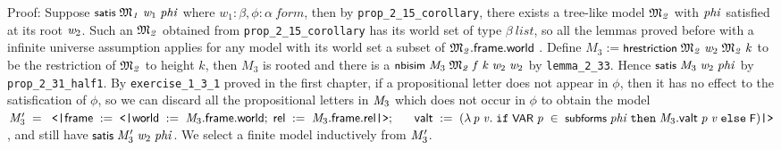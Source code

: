 \documentclass[letterpaper]{article}
\renewcommand{\HOLConst}[1]{{\textsf{\upshape\small #1}}}
\renewcommand{\HOLinline}[1]{\ensuremath{#1}}
\renewcommand{\HOLKeyword}[1]{\texttt{#1}}
\begin{document}
Proof: Suppose \HOLinline{\HOLConst{satis}\;\HOLFreeVar{\ensuremath{\mathfrak{M}\sb{1}}}\;\HOLFreeVar{w\sb{\mathrm{1}}}\;\HOLFreeVar{phi}} where $w_1:\beta,\phi:\alpha\ form$, then by \texttt{prop_2_15_corollary}, there exists a tree-like model \HOLinline{\HOLFreeVar{\ensuremath{\mathfrak{M}\sb{2}}}} with \HOLinline{\HOLFreeVar{phi}} satisfied at its root \HOLinline{\HOLFreeVar{w\sb{\mathrm{2}}}}. Such an \HOLinline{\HOLFreeVar{\ensuremath{\mathfrak{M}\sb{2}}}} obtained from \texttt{prop_2_15_corollary} has its world set of type $\beta\ list$, so all the lemmas proved before with a infinite universe assumption applies for any model with its world set a subset of \HOLinline{\HOLFreeVar{\ensuremath{\mathfrak{M}\sb{2}}}.\HOLFieldName{frame}.\HOLFieldName{world}} . Define $M_3:=$\HOLinline{\HOLConst{hrestriction}\;\HOLFreeVar{\ensuremath{\mathfrak{M}\sb{2}}}\;\HOLFreeVar{w\sb{\mathrm{2}}}\;\HOLFreeVar{\ensuremath{\mathfrak{M}\sb{2}}}\;\HOLFreeVar{k}} to be the restriction of \HOLinline{\HOLFreeVar{\ensuremath{\mathfrak{M}\sb{2}}}} to height $k$, then $M_3$ is rooted and there is a \HOLinline{\HOLConst{nbisim}\;\HOLFreeVar{M\sb{\mathrm{3}}}\;\HOLFreeVar{\ensuremath{\mathfrak{M}\sb{2}}}\;\HOLFreeVar{f}\;\HOLFreeVar{k}\;\HOLFreeVar{w\sb{\mathrm{2}}}\;\HOLFreeVar{w\sb{\mathrm{2}}}} by \texttt{lemma_2_33}. Hence \HOLinline{\HOLConst{satis}\;\HOLFreeVar{M\sb{\mathrm{3}}}\;\HOLFreeVar{w\sb{\mathrm{2}}}\;\HOLFreeVar{phi}} by \texttt{prop_2_31_half1}. By \texttt{exercise_1_3_1} proved in the first chapter, if a propositional letter does not appear in $\phi$, then it has no effect to the satisfication of $\phi$, so we can discard all the propositional letters in \HOLinline{\HOLFreeVar{M\sb{\mathrm{3}}}} which does not occur in $\phi$ to obtain the model \HOLinline{\HOLFreeVar{M\sb{\mathrm{3}}\sp{\prime}}\;\HOLSymConst{=}\\
\;\;\HOLTokenLeftrec{}\HOLFieldName{frame}\;:=\;\HOLTokenLeftrec{}\HOLFieldName{world}\;:=\;\HOLFreeVar{M\sb{\mathrm{3}}}.\HOLFieldName{frame}.\HOLFieldName{world};\;\HOLFieldName{rel}\;:=\;\HOLFreeVar{M\sb{\mathrm{3}}}.\HOLFieldName{frame}.\HOLFieldName{rel}\HOLTokenRightrec{};\\
\;\;\;\;\;\;\HOLFieldName{valt}\;:=\;(\HOLTokenLambda{}\HOLBoundVar{p}\;\HOLBoundVar{v}.\;\HOLKeyword{if}\;\HOLConst{VAR}\;\HOLBoundVar{p}\;\HOLSymConst{\HOLTokenIn{}}\;\HOLConst{subforms}\;\HOLFreeVar{phi}\;\HOLKeyword{then}\;\HOLFreeVar{M\sb{\mathrm{3}}}.\HOLFieldName{valt}\;\HOLBoundVar{p}\;\HOLBoundVar{v}\;\HOLKeyword{else}\;\HOLConst{F})\HOLTokenRightrec{}}, and still have \HOLinline{\HOLConst{satis}\;\HOLFreeVar{M\sb{\mathrm{3}}\sp{\prime}}\;\HOLFreeVar{w\sb{\mathrm{2}}}\;\HOLFreeVar{phi}}. We select a finite model inductively from \HOLinline{\HOLFreeVar{M\sb{\mathrm{3}}\sp{\prime}}}.
\end{document}
